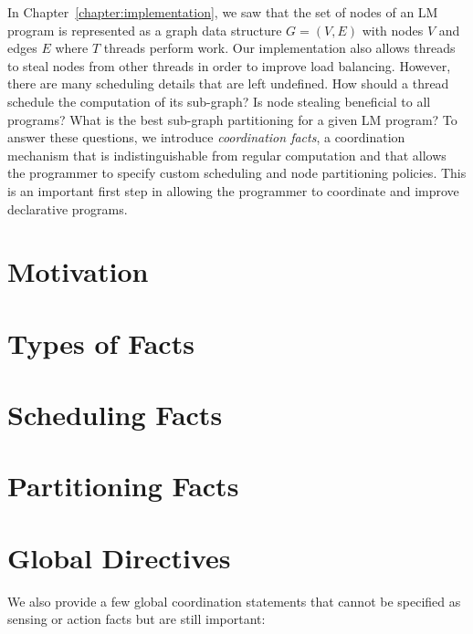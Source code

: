 In Chapter~\ref{chapter:implementation}, we saw that the set of nodes of an LM
program is represented as a graph data structure $G = (V, E)$ with nodes $V$ and
edges $E$ where $T$ threads perform work. Our implementation also allows threads
to steal nodes from other threads in order to improve load balancing.  However,
there are many scheduling details that are left undefined. How should a thread
schedule the computation of its sub-graph? Is node stealing beneficial to all
programs? What is the best sub-graph partitioning for a given LM program?  To
answer these questions, we introduce \emph{coordination facts}, a coordination
mechanism that is indistinguishable from regular computation and that allows the
programmer to specify custom scheduling and node partitioning policies. This is
an important first step in allowing the programmer to coordinate and improve
declarative programs.

\section{Motivation}\label{section:coord:rationale}



\section{Types of Facts}



\section{Scheduling Facts}\label{sec:coord:fifo}



\section{Partitioning Facts}


\section{Global Directives}\label{sec:coordination:global}

We also provide a few global coordination statements that cannot be specified
as sensing or action facts but are still important:

